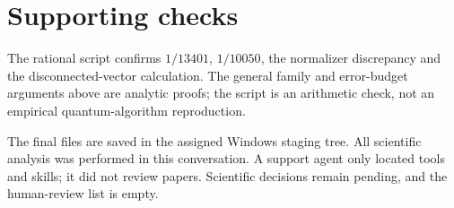 \documentclass[10pt]{article}
\begin{document}
\section*{Supporting checks}
The rational script confirms \(1/13401\), \(1/10050\), the normalizer discrepancy and the disconnected-vector calculation. The general family and error-budget arguments above are analytic proofs; the script is an arithmetic check, not an empirical quantum-algorithm reproduction.\par
The final files are saved in the assigned Windows staging tree. All scientific analysis was performed in this conversation. A support agent only located tools and skills; it did not review papers. Scientific decisions remain pending, and the human-review list is empty.\par
\end{document}
